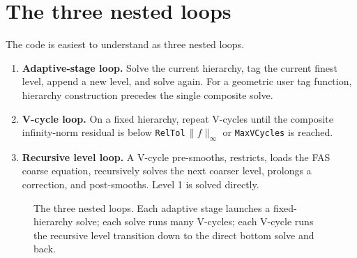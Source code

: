 \documentclass[11pt,oneside,openany]{book}
\newcommand{\code}[1]{\textnormal{\texttt{#1}}}
\begin{document}
\section{The three nested loops}
The code is easiest to understand as three nested loops.

\begin{enumerate}[label=\arabic*.]
\item \textbf{Adaptive-stage loop.} Solve the current hierarchy, tag the current finest level, append a new level, and solve again. For a geometric user tag function, hierarchy construction precedes the single composite solve.
\item \textbf{V-cycle loop.} On a fixed hierarchy, repeat V-cycles until the composite infinity-norm residual is below \code{RelTol}$\,\|f\|_\infty$ or \code{MaxVCycles} is reached.
\item \textbf{Recursive level loop.} A V-cycle pre-smooths, restricts, loads the FAS coarse equation, recursively solves the next coarser level, prolongs a correction, and post-smooths. Level 1 is solved directly.
\end{enumerate}

\begin{figure}[htbp]
\centering
{}
\caption{The three nested loops. Each adaptive stage launches a fixed-hierarchy solve; each solve runs many V-cycles; each V-cycle runs the recursive level transition down to the direct bottom solve and back.}
\label{fig:nestedloops}
\end{figure}
\end{document}
